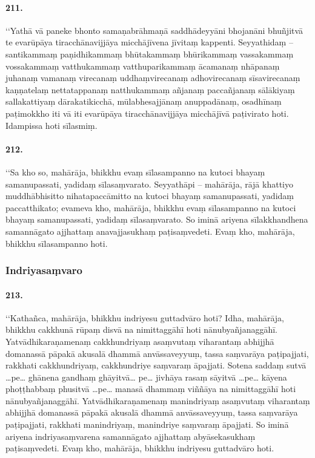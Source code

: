 \paragraph{211.} ‘‘Yathā vā paneke bhonto samaṇabrāhmaṇā saddhādeyyāni bhojanāni bhuñjitvā te evarūpāya tiracchānavijjāya micchājīvena jīvitaṃ kappenti. Seyyathidaṃ – santikammaṃ paṇidhikammaṃ bhūtakammaṃ bhūrikammaṃ vassakammaṃ vossakammaṃ vatthukammaṃ vatthuparikammaṃ ācamanaṃ nhāpanaṃ juhanaṃ vamanaṃ virecanaṃ uddhaṃvirecanaṃ adhovirecanaṃ sīsavirecanaṃ kaṇṇatelaṃ nettatappanaṃ natthukammaṃ añjanaṃ paccañjanaṃ sālākiyaṃ sallakattiyaṃ dārakatikicchā, mūlabhesajjānaṃ anuppadānaṃ, osadhīnaṃ paṭimokkho iti vā iti evarūpāya tiracchānavijjāya micchājīvā paṭivirato hoti. Idampissa hoti sīlasmiṃ.

\paragraph{212.} ‘‘Sa kho so, mahārāja, bhikkhu evaṃ sīlasampanno na kutoci bhayaṃ samanupassati, yadidaṃ sīlasaṃvarato. Seyyathāpi – mahārāja, rājā khattiyo muddhābhisitto nihatapaccāmitto na kutoci bhayaṃ samanupassati, yadidaṃ paccatthikato; evameva kho, mahārāja, bhikkhu evaṃ sīlasampanno na kutoci bhayaṃ samanupassati, yadidaṃ sīlasaṃvarato. So iminā ariyena sīlakkhandhena samannāgato ajjhattaṃ anavajjasukhaṃ paṭisaṃvedeti. Evaṃ kho, mahārāja, bhikkhu sīlasampanno hoti.


\subsubsection{Indriyasaṃvaro}

\paragraph{213.} ‘‘Kathañca, mahārāja, bhikkhu indriyesu guttadvāro hoti? Idha, mahārāja, bhikkhu cakkhunā rūpaṃ disvā na nimittaggāhī hoti nānubyañjanaggāhī. Yatvādhikaraṇamenaṃ cakkhundriyaṃ asaṃvutaṃ viharantaṃ abhijjhā domanassā pāpakā akusalā dhammā anvāssaveyyuṃ, tassa saṃvarāya paṭipajjati, rakkhati cakkhundriyaṃ, cakkhundriye saṃvaraṃ āpajjati. Sotena saddaṃ sutvā …pe… ghānena gandhaṃ ghāyitvā… pe… jivhāya rasaṃ sāyitvā …pe… kāyena phoṭṭhabbaṃ phusitvā …pe… manasā dhammaṃ viññāya na nimittaggāhī hoti nānubyañjanaggāhī. Yatvādhikaraṇamenaṃ manindriyaṃ asaṃvutaṃ viharantaṃ abhijjhā domanassā pāpakā akusalā dhammā anvāssaveyyuṃ, tassa saṃvarāya paṭipajjati, rakkhati manindriyaṃ, manindriye saṃvaraṃ āpajjati. So iminā ariyena indriyasaṃvarena samannāgato ajjhattaṃ abyāsekasukhaṃ paṭisaṃvedeti. Evaṃ kho, mahārāja, bhikkhu indriyesu guttadvāro hoti.

